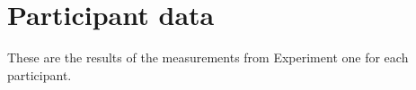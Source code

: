 \chapter{Participant data}

These are the results of the measurements from Experiment one for each participant. 

\newpage

\newpage

\newpage

\newpage
